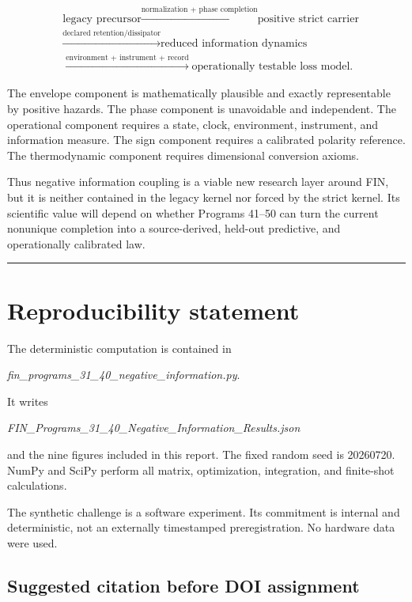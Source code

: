 \documentclass[11pt,a4paper,openany]{report}
\begin{document}
\[
\boxed{
\begin{aligned}
&\text{legacy precursor}
\xrightarrow{\text{normalization + phase completion}}
\text{positive strict carrier}\\
&\xrightarrow{\text{declared retention/dissipator}}
\text{reduced information dynamics}\\
&\xrightarrow{\text{environment + instrument + record}}
\text{operationally testable loss model}.
\end{aligned}}
\]

The envelope component is mathematically plausible and exactly representable by positive hazards. The phase component is unavoidable and independent. The operational component requires a state, clock, environment, instrument, and information measure. The sign component requires a calibrated polarity reference. The thermodynamic component requires dimensional conversion axioms.

Thus negative information coupling is a viable new research layer around FIN, but it is neither contained in the legacy kernel nor forced by the strict kernel. Its scientific value will depend on whether Programs 41–50 can turn the current nonunique completion into a source-derived, held-out predictive, and operationally calibrated law.

\par\medskip\hrule\medskip

\chapter{Reproducibility statement}

The deterministic computation is contained in

\emph{fin\_programs\_31\_40\_negative\_information.py}.

It writes

\emph{FIN\_Programs\_31\_40\_Negative\_Information\_Results.json}

and the nine figures included in this report. The fixed random seed is 20260720. NumPy and SciPy perform all matrix, optimization, integration, and finite-shot calculations.

The synthetic challenge is a software experiment. Its commitment is internal and deterministic, not an externally timestamped preregistration. No hardware data were used.

\section{Suggested citation before DOI assignment}
\end{document}
